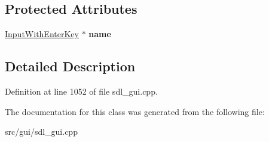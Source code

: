 \subsection*{Protected Attributes}
\begin{DoxyCompactItemize}
\item 
\hypertarget{classSetCycles_ad75bca3a041f5aa2d66ede78b1f563c9}{\hyperlink{classInputWithEnterKey}{Input\-With\-Enter\-Key} $\ast$ {\bfseries name}}\label{classSetCycles_ad75bca3a041f5aa2d66ede78b1f563c9}

\end{DoxyCompactItemize}


\subsection{Detailed Description}


Definition at line 1052 of file sdl\-\_\-gui.\-cpp.



The documentation for this class was generated from the following file\-:\begin{DoxyCompactItemize}
\item 
src/gui/sdl\-\_\-gui.\-cpp\end{DoxyCompactItemize}
